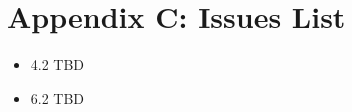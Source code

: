\section{Appendix C: Issues List}
\begin{itemize}
    \item 4.2 TBD
    \item 6.2 TBD
\end{itemize}


 
\nocite{*}
\printbibliography[heading=bibintoc]

